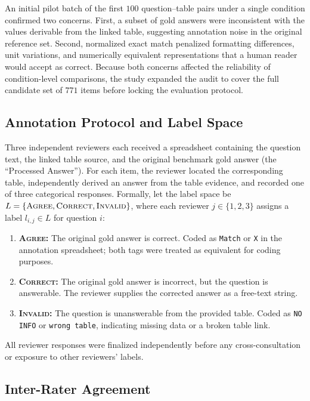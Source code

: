 ﻿\documentclass[a4paper]{article}
\begin{document}
An initial pilot batch of the first $100$ question--table pairs under a single condition confirmed two concerns. First, a subset of gold answers were inconsistent with the values derivable from the linked table, suggesting annotation noise in the original reference set. Second, normalized exact match penalized formatting differences, unit variations, and numerically equivalent representations that a human reader would accept as correct. Because both concerns affected the reliability of condition-level comparisons, the study expanded the audit to cover the full candidate set of $771$ items before locking the evaluation protocol.

\subsection{Annotation Protocol and Label Space}

Three independent reviewers each received a spreadsheet containing the question text, the linked table source, and the original benchmark gold answer (the ``Processed Answer''). For each item, the reviewer located the corresponding table, independently derived an answer from the table evidence, and recorded one of three categorical responses. Formally, let the label space be $L = \{\textsc{Agree}, \textsc{Correct}, \textsc{Invalid}\}$, where each reviewer $j \in \{1, 2, 3\}$ assigns a label $l_{i,j} \in L$ for question $i$:

\begin{enumerate}
    \item \textbf{\textsc{Agree}:} The original gold answer is correct. Coded as \texttt{Match} or \texttt{X} in the annotation spreadsheet; both tags were treated as equivalent for coding purposes.
    \item \textbf{\textsc{Correct}:} The original gold answer is incorrect, but the question is answerable. The reviewer supplies the corrected answer as a free-text string.
    \item \textbf{\textsc{Invalid}:} The question is unanswerable from the provided table. Coded as \texttt{NO INFO} or \texttt{wrong table}, indicating missing data or a broken table link.
\end{enumerate}

All reviewer responses were finalized independently before any cross-consultation or exposure to other reviewers' labels.

\subsection{Inter-Rater Agreement}
\end{document}

